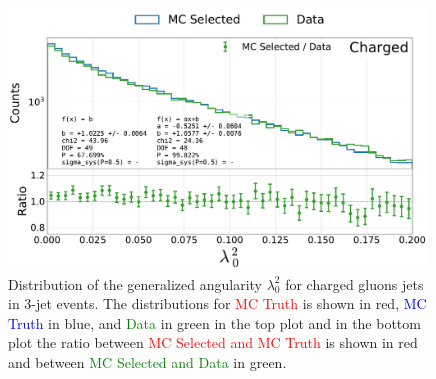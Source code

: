 \begin{figure}[h!]
  \centerfloat
  \includegraphics[width=0.99\textwidth, trim=0 0 0 0, clip, page=1]{figures/quarks/generalized_angularities_cha-down_sample=1.00-ML_vars=vertex-selection=b-ejet_min=4-n_iter_RS_lgb=99-n_iter_RS_xgb=9-cdot_cut=0.90-version=19.pdf}
  \caption[Generalized Angularities for Charged Gluons Jets: $\lambda_0^2$]
          {Distribution of the generalized angularity $\lambda_0^2$ for charged gluons jets in 3-jet events. The distributions for \textcolor{red}{MC Truth} is shown in red, \textcolor{blue}{MC Truth} in blue, and \textcolor{green}{Data} in green in the top plot and in the bottom plot the ratio between \textcolor{red}{MC Selected and MC Truth} is shown in red and between \textcolor{green}{MC Selected and Data} in green. }
  \label{fig:q:generalized_angularities_cha_lambda_0_2}
\end{figure}
